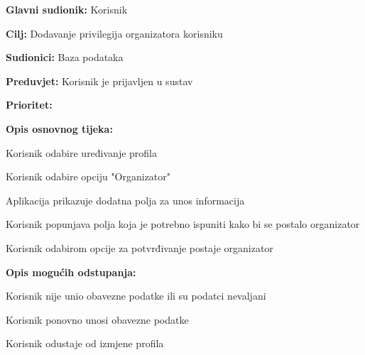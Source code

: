 \noindent {}
   	\begin{packed_item}
   		
   		\item \textbf{Glavni sudionik: }Korisnik
   		\item  \textbf{Cilj:} Dodavanje privilegija organizatora korisniku
   		\item  \textbf{Sudionici:} Baza podataka
   		\item  \textbf{Preduvjet:} Korisnik je prijavljen u sustav
   		\item  \textbf{Prioritet:} 
   		\item  \textbf{Opis osnovnog tijeka:}
   		
   		\item[] \begin{packed_enum}
   			
   			\item Korisnik odabire uređivanje profila
   			\item Korisnik odabire opciju "Organizator"
   			\item Aplikacija prikazuje dodatna polja za unos informacija
   			\item Korisnik popunjava polja koja je potrebno ispuniti kako bi se postalo organizator
   			\item Korisnik odabirom opcije za potvrđivanje postaje organizator
   			
   		\end{packed_enum}
   		
   		\item  \textbf{Opis mogućih odstupanja:}
   		
   		\item[] \begin{packed_item}
   			
   			\item[4.a] Korisnik nije unio obavezne podatke ili su podatci nevaljani
   			\item[] \begin{packed_enum}
   				
   				\item Korisnik ponovno unosi obavezne podatke
   				\item Korisnik odustaje od izmjene profila
   				
   			\end{packed_enum}
   		\end{packed_item}
   	\end{packed_item}


